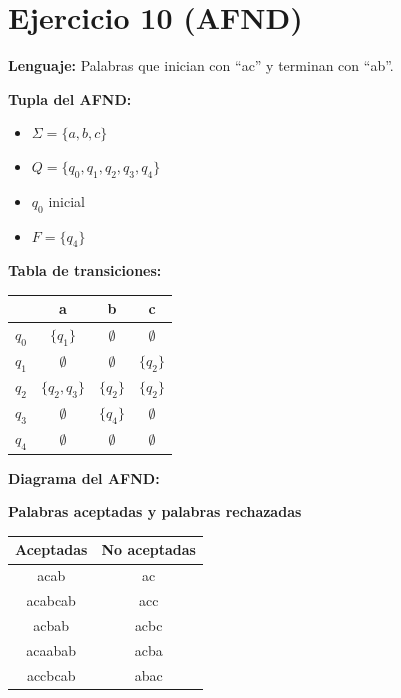\documentclass{article}
\begin{document}
\section*{Ejercicio 10 (AFND)}
\textbf{Lenguaje:} Palabras que inician con “ac” y terminan con “ab”.  

\textbf{Tupla del AFND:}
\begin{itemize}
    \item $\Sigma = \{a,b,c\}$
    \item $Q = \{q_0,q_1,q_2,q_3,q_4\}$
    \item $q_0$ inicial
    \item $F = \{q_4\}$
\end{itemize}

\textbf{Tabla de transiciones:}
\begin{center}
\begin{tabular}{|c|c|c|c|}
\hline
 & a & b & c \\ \hline
$q_0$ & $\{q_1\}$ & $\emptyset$ & $\emptyset$ \\ \hline
$q_1$ & $\emptyset$ & $\emptyset$ & $\{q_2\}$ \\ \hline
$q_2$ & $\{q_2,q_3\}$ & $\{q_2\}$ & $\{q_2\}$ \\ \hline
$q_3$ & $\emptyset$ & $\{q_4\}$ & $\emptyset$ \\ \hline
$q_4$ & $\emptyset$ & $\emptyset$ & $\emptyset$ \\ \hline
\end{tabular}
\end{center}

\textbf{Diagrama del AFND:}
\begin{center}
\end{center}

\textbf{Palabras aceptadas y palabras rechazadas}
\begin{center}
\begin{tabular}{|c|c|}
\hline
Aceptadas & No aceptadas \\
\hline
acab & ac \\
acabcab & acc \\
acbab & acbc \\
acaabab & acba \\
accbcab & abac \\
\hline
\end{tabular}
\end{center}
\end{document}
